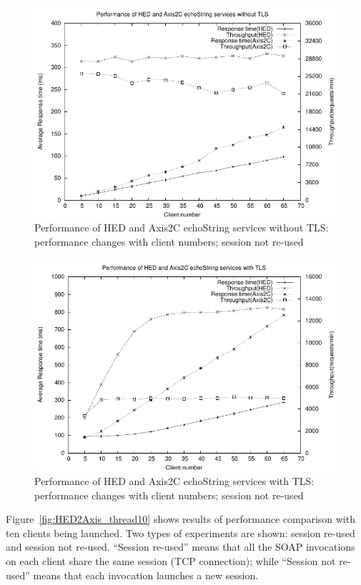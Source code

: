 \documentclass[conference]{IEEEtran}
\begin{document}
\begin{figure}
\includegraphics[width=0.9\columnwidth]{TCP_thread_all.pdf}
\caption{Performance of HED and Axis2C echoString services without TLS:
performance
changes with client numbers; session not re-used }
\label{fig:TCP_thread_all}
\end{figure}

\begin{figure}
\includegraphics[width=0.9\columnwidth]{TLS_thread_all.pdf}
\caption{Performance of HED and Axis2C echoString services with TLS: performance
changes with client numbers; session not re-used}
\label{fig:TLS_thread_all}
\end{figure}

Figure~\ref{fig:HED2Axis_thread10} shows results of performance comparison with
ten clients being launched.
Two types of experiments are shown: session re-used and session not re-used.
``Session re-used'' means that all the SOAP invocations on each client share
the same session (TCP connection); while ``Session not re-used'' means that each invocation
launches a new session.
\end{document}
